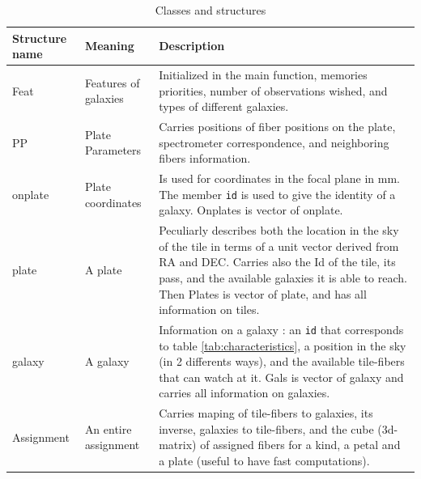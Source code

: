 \documentclass[10pt]{extarticle}
\begin{document}
\begin{table}[H]\begin{center}
	\caption{Classes and structures}\label{tab:structures}
	\begin{tabular}{|l|l|p{12cm}|}\\ \hline
		Structure name & Meaning & Description \\ \hline \hline

		Feat & Features of galaxies & Initialized in the main function, memories priorities, number of observations wished, and types of different galaxies.\\ \hline

		PP & Plate Parameters & Carries positions of fiber positions on the plate, spectrometer correspondence, and neighboring fibers information.\\ 

		onplate & Plate coordinates & Is used for coordinates in the focal plane in mm. The member {\tt id} is used to give the identity of a galaxy. Onplates is vector of onplate.\\ 

		plate & A plate & Peculiarly describes both the location in the sky of the tile in terms of a unit vector derived from RA and DEC. Carries also the Id of the tile, its pass, and the available galaxies it is able to reach. Then Plates is vector of plate, and has all information on tiles.\\ \hline

		galaxy & A galaxy & Information on a galaxy : an {\tt id} that corresponds to table \ref{tab:characteristics}, a position in the sky (in 2 differents ways), and the available tile-fibers that can watch at it. Gals is vector of galaxy and carries all information on galaxies.\\ \hline

		Assignment & An entire assignment & Carries maping of tile-fibers to galaxies, its inverse, galaxies to tile-fibers, and the cube (3d-matrix) of assigned fibers for a kind, a petal and a plate (useful to have fast computations).\\ \hline
	\end{tabular}\end{center}
\end{table}
\end{document}
